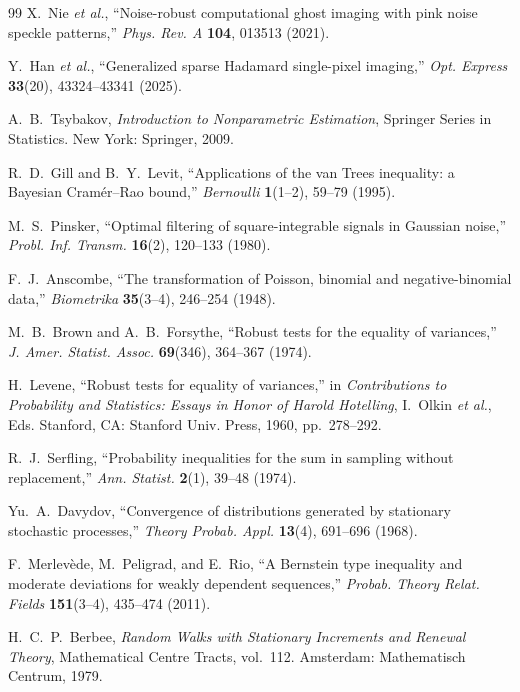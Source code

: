 \begin{thebibliography}{99}
X.~Nie \emph{et al.}, ``Noise-robust computational ghost imaging with pink noise speckle patterns,'' \emph{Phys. Rev. A} \textbf{104}, 013513 (2021).

Y.~Han \emph{et al.}, ``Generalized sparse Hadamard single-pixel imaging,'' \emph{Opt. Express} \textbf{33}(20), 43324--43341 (2025).

A.~B.~Tsybakov, \emph{Introduction to Nonparametric Estimation}, Springer Series in Statistics. New York: Springer, 2009.

R.~D.~Gill and B.~Y.~Levit, ``Applications of the van Trees inequality: a Bayesian Cram\'er--Rao bound,'' \emph{Bernoulli} \textbf{1}(1--2), 59--79 (1995).

M.~S.~Pinsker, ``Optimal filtering of square-integrable signals in Gaussian noise,'' \emph{Probl. Inf. Transm.} \textbf{16}(2), 120--133 (1980).

F.~J.~Anscombe, ``The transformation of Poisson, binomial and negative-binomial data,'' \emph{Biometrika} \textbf{35}(3--4), 246--254 (1948).

M.~B.~Brown and A.~B.~Forsythe, ``Robust tests for the equality of variances,'' \emph{J. Amer. Statist. Assoc.} \textbf{69}(346), 364--367 (1974).

H.~Levene, ``Robust tests for equality of variances,'' in \emph{Contributions to Probability and Statistics: Essays in Honor of Harold Hotelling}, I.~Olkin \emph{et al.}, Eds. Stanford, CA: Stanford Univ. Press, 1960, pp.~278--292.

R.~J.~Serfling, ``Probability inequalities for the sum in sampling without replacement,'' \emph{Ann. Statist.} \textbf{2}(1), 39--48 (1974).

Yu.~A.~Davydov, ``Convergence of distributions generated by stationary stochastic processes,'' \emph{Theory Probab. Appl.} \textbf{13}(4), 691--696 (1968).

F.~Merlev\`ede, M.~Peligrad, and E.~Rio, ``A Bernstein type inequality and moderate deviations for weakly dependent sequences,'' \emph{Probab. Theory Relat. Fields} \textbf{151}(3--4), 435--474 (2011).

H.~C.~P.~Berbee, \emph{Random Walks with Stationary Increments and Renewal Theory}, Mathematical Centre Tracts, vol.~112. Amsterdam: Mathematisch Centrum, 1979.


\end{thebibliography}
